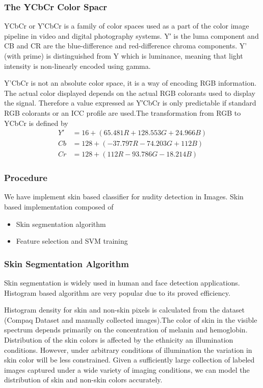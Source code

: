 \subsubsection{The YCbCr Color Spacr}
YCbCr or Y′CbCr is a family of color spaces used as a part of the color image pipeline in video and digital photography systems. Y′ is the luma component and CB and CR are the blue-difference and red-difference chroma  components. Y' (with prime) is distinguished from Y which is luminance, meaning that light intensity is non-linearly encoded using gamma.

Y'CbCr is not an absolute color space, it is a way of encoding RGB information. The actual color displayed depends on the actual RGB colorants used to display the signal. Therefore a value expressed as Y′CbCr is only predictable if standard RGB colorants or an ICC profile are used.The transformation from RGB to YCbCr is defined by
\begin{align}
Y'&=16+ (65.481R + 128.553G + 24.966B)\\
Cb&=128+(-37.797R- 74.203G +112B)\\
Cr&=128+(112R -93.786G - 18.214B)
\end{align}
%

\subsubsection{Procedure}

We have implement skin based classifier for nudity detection in Images. Skin based implementation composed of
\begin{itemize}
\item Skin segmentation algorithm

\item  Feature selection and SVM training
\end{itemize}

\subsubsection{Skin Segmentation Algorithm}
Skin segmentation is widely used in human and face detection applications. Histogram based algorithm are very popular due to its proved efficiency.

Histogram density for skin and non-skin pixels is calculated from the dataset (Compaq Dataset and manually collected images).The color of skin in the visible spectrum depends primarily on the concentration of melanin and hemoglobin. Distribution of the skin colors is affected by the ethnicity an illumination conditions. However, under arbitrary conditions of illumination the variation in skin color will be less constrained. Given a sufficiently large collection of labeled images captured under a wide variety of imaging conditions, we can model the distribution of skin and non-skin colors accurately.

